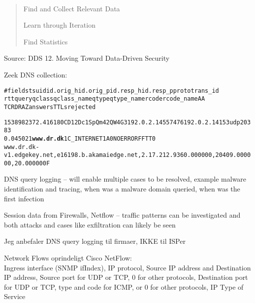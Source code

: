 \documentclass[Screen16to9,17pt]{foils}
\begin{document}

~ 

\vspace{-3cm}

\begin{quote}
\begin{list2}
\item Find and Collect Relevant Data
\item Learn through Iteration
\item Find Statistics
\end{list2}

\end{quote}
Source: DDS 12. Moving Toward Data-Driven Security



Zeek DNS collection:
\begin{alltt}\footnotesize
#fields ts      uid     id.orig_h       id.orig_p       id.resp_h       id.resp_p       proto   trans_id
        rtt     query   qclass  qclass_name     qtype   qtype_name      rcode   rcode_name      AA
        TC      RD      RA      Z       answers TTLs    rejected

1538982372.416180	CD12Dc1SpQm42QW4G3	192.0.2.145	57476	192.0.2.141	53	udp	20383
	0.045021	{\bf www.dr.dk}	1	C_INTERNET	1	A	0	NOERROR	F	F	T	T	0
www.dr.dk-v1.edgekey.net,e16198.b.akamaiedge.net,2.17.212.93	60.000000,20409.000000,20.000000 F
\end{alltt}

\begin{list2}
\item DNS query logging -- will enable multiple cases to be resolved, example malware identification and tracing, when was a malware domain queried, when was the first infection
\item Session data from Firewalls, Netflow -- traffic patterns can be investigated and both attacks and cases like exfiltration can likely be seen
\end{list2}

\centerline{Jeg anbefaler DNS query logging til firmaer, IKKE til ISPer}




\begin{list1}
\item Network Flows oprindeligt Cisco NetFlow:\\
{\small Ingress interface (SNMP ifIndex), IP protocol, Source IP address and Destination IP address, Source port for UDP or TCP, 0 for other protocols, Destination port for UDP or TCP, type and code for ICMP, or 0 for other protocols, IP Type of Service}
\end{list1}
\end{document}
